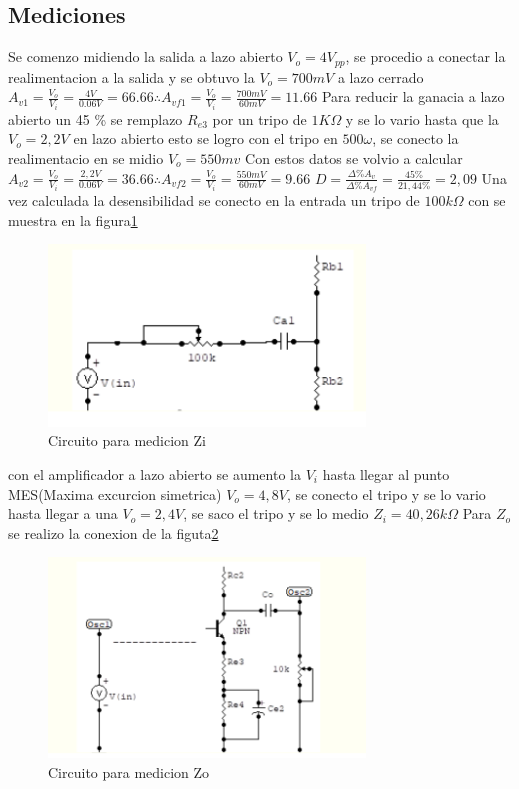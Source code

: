 \documentclass[12pt, letterpaper]{article}
\begin{document}
\subsection{Mediciones}
Se comenzo midiendo la salida a lazo abierto $V_o=4V_{pp}$, se procedio a conectar la realimentacion a la salida y se obtuvo la $V_o=700mV$ a lazo cerrado
\singlespacing
$A_{v1}=\frac{V_o}{V_{i}}=\frac{4V}{0.06V}=66.66\therefore A_{vf1}=\frac{V_o}{V_{i}}=\frac{700mV}{60mV}=11.66$
\singlespacing
Para reducir la ganacia a lazo abierto un 45 \% se remplazo $R_{e3}$ por un tripo de $1K\Omega$ y se lo vario hasta que la $V_o=2,2V$ en lazo abierto esto se logro con el tripo en $500\omega$, se conecto la realimentacio en se midio $V_o=550mv$
\singlespacing
Con estos datos se volvio a calcular $A_{v2}=\frac{V_o}{V_{i}}=\frac{2,2V}{0.06V}=36.66\therefore A_{vf2}=\frac{V_o}{V_{i}}=\frac{550mV}{60mV}=9.66$
\singlespacing
$D=\frac{\Delta \% A_v}{\Delta \% A_{vf}}=\frac{45\%}{21,44\%}=2,09$
\singlespacing
Una vez calculada la desensibilidad se conecto en la entrada un tripo de $100k\Omega$ con se muestra en la figura\ref{fig:4.2}
\singlespacing
\begin{figure}[h!]
	\centering
	\includegraphics[width=0.75\textwidth]{Imagenes/zi.png}
	\caption{Circuito para medicion Zi}
	\label{fig:4.2}
\end{figure}
con el amplificador a lazo abierto se aumento la $V_i$ hasta llegar al punto MES(Maxima excurcion simetrica) $V_o=4,8V$, se conecto el tripo y se lo vario hasta llegar a una $V_o=2,4V$, se saco el tripo y se lo medio
\singlespacing
$Z_i=40,26k\Omega$
\singlespacing
Para $Z_o$ se realizo la conexion de la figuta\ref{fig:4.3}
\singlespacing
\begin{figure}[h]
	\centering
	\includegraphics[width=0.75\textwidth]{Imagenes/zo.png}
	\caption{Circuito para medicion Zo}
	\label{fig:4.3}
\end{figure}
\label{LastPage}
\end{document}
